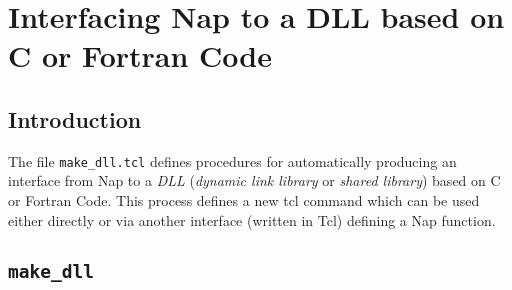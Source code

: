 
\section{Interfacing Nap to a DLL based on C or Fortran Code}
    \label{make-dll}

\subsection{Introduction}
    \label{make-dll-Introduction}

The file 
  \texttt{make\_dll.tcl} defines procedures for automatically
  producing an interface from Nap to a 
  \emph{DLL} (\emph{dynamic link library} or 
  \emph{shared library}) based on C or Fortran Code. This process
  defines a new tcl command which can be used either directly or via
  another interface (written in Tcl) defining a Nap function.

\subsection{\texttt{make\_dll}}
\label{make-dll-make-dll}

